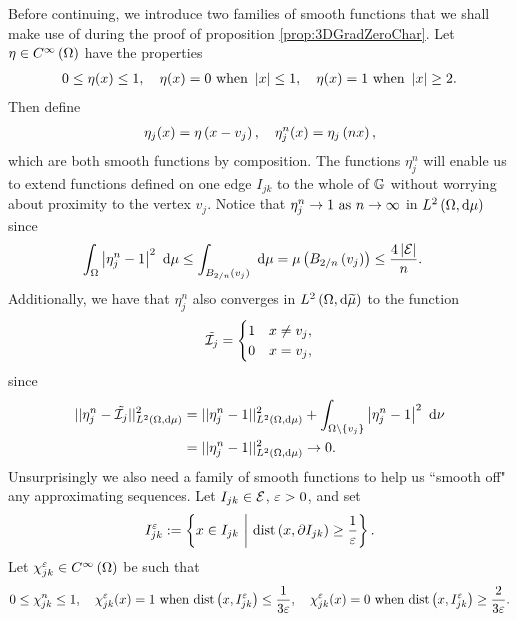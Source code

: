 Before continuing, we introduce two families of smooth functions that we shall make use of during the proof of proposition \ref{prop:3DGradZeroChar}.
Let $\eta\in C^{\infty}\left( \Omega \right)$ have the properties
\begin{align*}
	0 \leq \eta(x) \leq 1, \quad
	\eta(x) = 0 \text{ when } \left\lvert x \right\rvert \leq 1, \quad
	\eta(x) = 1 \text{ when } \left\lvert x \right\rvert \geq 2.
\end{align*}
Then define
\begin{align} \label{eq:SmoothEtaDef}
	\eta_j(x) = \eta\left( x-v_j \right), \quad
	\eta_j^n(x) = \eta_j\left( nx \right),
\end{align}
which are both smooth functions by composition.
The functions $\eta_j^n$ will enable us to extend functions defined on one edge $I_{jk}$ to the whole of $\mathbb{G}$ without worrying about proximity to the vertex $v_j$.
Notice that $\eta_j^n\rightarrow 1 \ \text{as} \ n \rightarrow\infty$ in $L^{2}\left( \Omega,\mathrm{d}\mu \right)$ since
\begin{align*}
	\int_{\Omega} \left\lvert \eta_j^n - 1 \right\rvert^2  \ \mathrm{d}\mu &\leq
	\int_{ B_{2/n}\left( v_j \right) } \ \mathrm{d}\mu
	= \mu\left(  B_{2/n}\left( v_j \right)  \right) \leq \frac{4\left\lvert \mathcal{E} \right\rvert}{n}.
\end{align*}
Additionally, we have that $\eta_j^n$ also converges in $L^{2}\left( \Omega,\mathrm{d}\widetilde{\mu} \right)$ to the function
\begin{align*}
	\tilde{\mathcal{I}_{j}} = \begin{cases} 1 & x\neq v_j, \\ 0 & x=v_j, \end{cases}
\end{align*}
since
\begin{align*}
	\lvert\lvert \eta_j^n - \tilde{\mathcal{I}_{j}} \rvert\rvert_{L^{2}\left( \Omega,\mathrm{d}\mu \right)}^2
	&= \lvert\lvert \eta_j^n - 1 \rvert\rvert_{L^{2}\left( \Omega,\mathrm{d}\mu \right)}^2
	+ \int_{\Omega\setminus\left\{ v_j \right\}} \left\lvert \eta_j^n - 1 \right\rvert^2  \ \mathrm{d}\nu \\
	&= \lvert\lvert \eta_j^n - 1 \rvert\rvert_{L^{2}\left( \Omega,\mathrm{d}\mu \right)}^2 \rightarrow 0.
\end{align*}
Unsurprisingly we also need a family of smooth functions to help us ``smooth off" any approximating sequences.
Let $I_{jk}\in\mathcal{E}$, $\varepsilon>0$, and set
\begin{align} \label{eq:ShortenedEdgeDef}
	I_{jk}^\varepsilon := \left\{  x\in I_{jk} \ \middle\vert \  \mathrm{dist}\left( x,\partial I_{jk} \right)\geq\frac{1}{\varepsilon}  \right\}.
\end{align}
Let $\chi_{jk}^\varepsilon\in C^{\infty}\left( \Omega \right)$ be such that
\begin{align} \label{eq:SmoothChiDef}
	0 \leq \chi_{jk}^n \leq 1, \quad
	\chi_{jk}^\varepsilon(x) = 1 \text{ when } \mathrm{dist}\left( x, I_{jk}^\varepsilon \right)\leq \frac{1}{3\varepsilon}, \quad
	\chi_{jk}^\varepsilon(x) = 0 \text{ when } \mathrm{dist}\left( x, I_{jk}^\varepsilon \right)\geq \frac{2}{3\varepsilon}.
\end{align}
